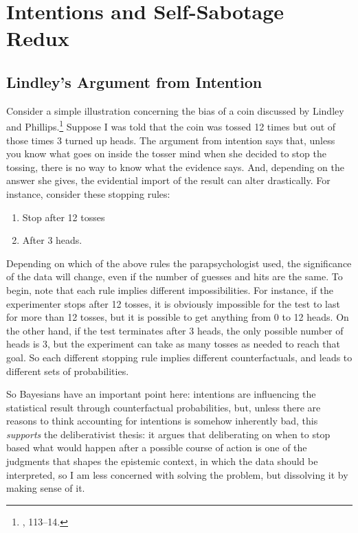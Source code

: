 \hypertarget{intentions-and-self-sabotage-redux}{%
\section{Intentions and Self-Sabotage
Redux}\label{sec:intentions-and-self-sabotage-redux}}
\subsection{Lindley's Argument from Intention}
Consider a simple illustration concerning the bias of a coin discussed
by Lindley and Phillips.\footnote{\cite{lindleybern}, 113--14.} Suppose I was told
that the coin was tossed 12 times but out of those times 3 turned up
heads. The argument from intention says that, unless you know what goes
on inside the tosser mind when she decided to stop the tossing, there is
no way to know what the evidence says. And, depending on the answer she
gives, the evidential import of the result can alter drastically. For
instance, consider these stopping rules:

\begin{enumerate}
\def\labelenumi{\arabic{enumi}.}
\tightlist
\item
  Stop after 12 tosses
\item
  After 3 heads.
\end{enumerate}

Depending on which of the above rules the
parapsychologist used, the significance of the data will change, even if
the number of guesses and hits are the same. To begin, note that each
rule implies different impossibilities. For instance, if the
experimenter stops after 12 tosses, it is obviously impossible for the
test to last for more than 12 tosses, but it is possible to get anything from 0 to 12 heads. On the other hand, if
the test terminates after 3 heads, the only possible number of heads is
3, but the experiment can take as many tosses as needed to reach that
goal. So each different stopping rule implies different counterfactuals,
and leads to different sets of probabilities.

So Bayesians have an important point here: intentions are influencing
the statistical result through counterfactual probabilities, but, unless
there are reasons to think accounting for intentions is somehow
inherently bad, this \emph{supports} the deliberativist thesis: it argues that deliberating on when to stop based what would happen after a possible course of action is one of the judgments that shapes the epistemic context, in which the data should be interpreted, so I am less concerned with solving the problem, but dissolving it by making sense of it. 

